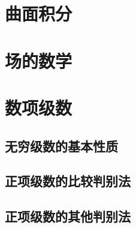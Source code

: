\documentclass[a4paper, 11pt]{ctexbook}
\begin{document}
        \chapter{曲面积分}
        \chapter{场的数学}
        \chapter{数项级数}
            \section{无穷级数的基本性质}
                
            \section{正项级数的比较判别法}
                
            \section{正项级数的其他判别法}
                
\end{document}
